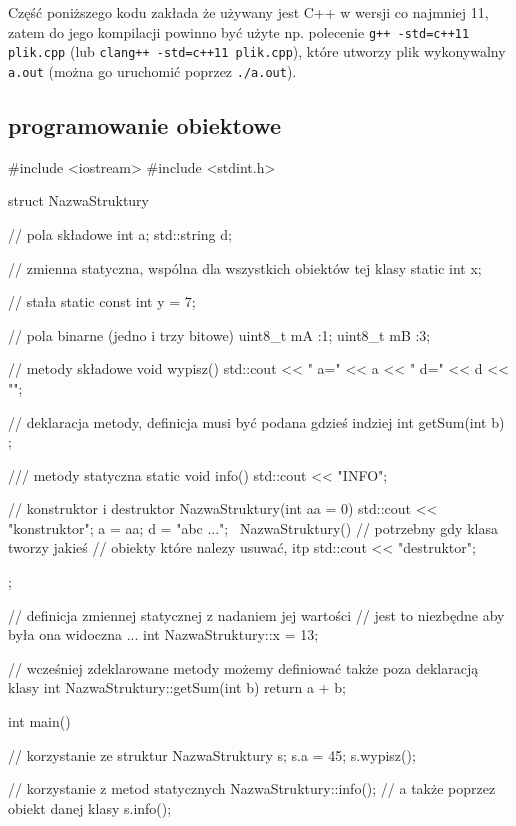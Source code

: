 Część poniższego kodu zakłada że używany jest C++ w wersji co najmniej 11, zatem do jego kompilacji powinno być użyte np. polecenie \Verb#g++ -std=c++11 plik.cpp# (lub \Verb#clang++ -std=c++11 plik.cpp#), które utworzy plik wykonywalny \Verb#a.out# (można go uruchomić poprzez \Verb#./a.out#).

\subsection{programowanie obiektowe}

\begin{CodeFrame*}[cpp]{}
#include <iostream>
#include <stdint.h>

struct NazwaStruktury {
    // pola składowe
    int a;
    std::string d;
    
    // zmienna statyczna, wspólna dla wszystkich obiektów tej klasy
    static int x;
    
    // stała
    static const int y = 7;
    
    // pola binarne (jedno i trzy bitowe)
    uint8_t mA :1;
    uint8_t mB :3;
    
    // metody składowe
    void wypisz() {
        std::cout << " a=" << a << " d=" << d << "\n";
    }
    
    // deklaracja metody, definicja musi być podana gdzieś indziej
    int getSum(int b) ;
    
    /// metody statyczna
    static void info() {
        std::cout << "INFO\n";
    }
    
    // konstruktor i destruktor
    NazwaStruktury(int aa = 0) {
        std::cout << "konstruktor\n";
        a = aa;
        d = "abc ...";
    }
    ~NazwaStruktury() {
        // potrzebny gdy klasa tworzy jakieś
        // obiekty które nalezy usuwać, itp
        std::cout << "destruktor\n";
    }
};

// definicja zmiennej statycznej z nadaniem jej wartości
// jest to niezbędne aby była ona widoczna ...
int NazwaStruktury::x = 13;

// wcześniej zdeklarowane metody możemy definiować także poza deklaracją klasy
int NazwaStruktury::getSum(int b) {
    return a + b;
}

int main() {
    // korzystanie ze struktur
    NazwaStruktury s;
    s.a = 45;
    s.wypisz();

    // korzystanie z metod statycznych
    NazwaStruktury::info();
    // a także poprzez obiekt danej klasy
    s.info();
}
\end{CodeFrame*}

